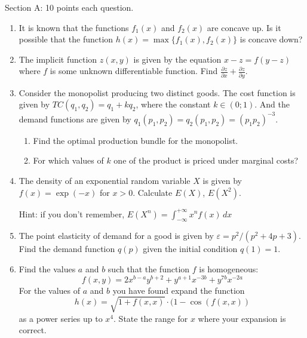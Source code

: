 \documentclass[pdftex,12pt,a4paper]{article}
\begin{document}
Section A: 10 points  each question.
\begin{enumerate}


\item It is known that the functions $f_1(x)$ and $f_2(x)$ are concave up. Is it possible that the function $h(x)=\max\{f_1(x),f_2(x)\}$ is concave down?

\item The implicit function $z(x,y)$ is given by the equation $x-z=f(y-z)$ where $f$ is some unknown differentiable function. Find $\frac{\partial z}{\partial x}+\frac{\partial z}{\partial y}$.
\item Consider the monopolist producing two distinct goods. The cost function is given by $TC(q_1,q_2)=q_1+kq_2$, where the constant $k\in (0;1)$. And the demand functions are given by $q_1(p_1,p_2)=q_2(p_1,p_2)=(p_1p_2)^{-3}$.
\begin{enumerate}
\item Find the optimal production bundle for the monopolist.
\item For which values of $k$ one of the product is priced under marginal costs? %
\end{enumerate}
\item The density of an exponential random variable $X$ is given by $f(x)=\exp(-x)$ for $x>0$. Calculate $E(X)$, $E(X^2)$.

Hint: if you don't remember, $E(X^n)=\int_{-\infty}^{+\infty}x^nf(x)\,dx$
\item The point elasticity of demand for a good is given by $\varepsilon=p^2/(p^2+4p+3)$. Find the demand function $q(p)$ given the initial condition $q(1)=1$.


\item Find the values $a$ and $b$ such that the function $f$ is homogeneous:
\[f(x,y)=2x^{b-a}y^{b+2}+y^{a+1}x^{-3b}+y^{7b}x^{-2a}\]
For the values of $a$ and $b$ you have found expand the function \[h(x)=\sqrt{1+f(x,x)}\cdot (1-\cos(f(x,x))\] as a power series up to $x^4$. State the range for $x$  where your expansion is correct.

\end{enumerate}
\end{document}
